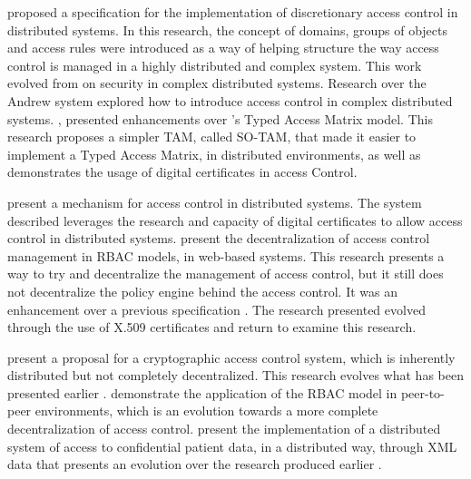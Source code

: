 \citeauthor{moffett_specifying_1990} \cite{moffett_specifying_1990} proposed a specification for the implementation of discretionary access control in distributed systems. In this research, the concept of domains, groups of objects and access rules were introduced as a way of helping structure the way access control is managed in a highly distributed and complex system. This work evolved from \citeauthor{satyanarayanan_integrating_1989} \cite{satyanarayanan_integrating_1989} on security in complex distributed systems. Research over the Andrew system \cite{satyanarayanan_integrating_1989} explored how to introduce access control in complex distributed systems. \citeauthor{sandhu_implementation_1992} \cite{sandhu_implementation_1992}, presented enhancements over  \citeauthor{sandhu_typed_1992}’s \cite{sandhu_typed_1992} Typed Access Matrix model. This research proposes a simpler TAM, called SO-TAM, that made it easier to implement a Typed Access Matrix, in distributed environments, as well as demonstrates the usage of digital certificates in access Control.

\citeauthor{johnston_authorization_1998} \cite{johnston_authorization_1998} present a mechanism for access control in distributed systems. The system described leverages the research and capacity of digital certificates to allow access control in distributed systems. \citeauthor{sandhu_decentralized_1998} \cite{sandhu_decentralized_1998} present the decentralization of access control management in RBAC models, in web-based systems. This research presents a way to try and decentralize the management of access control, but it still does not decentralize the policy engine behind the access control. It was an enhancement over a previous specification \cite{barkley_role_1997}. The research presented \cite{sandhu_decentralized_1998} evolved through the use of X.509 certificates \cite{park_smart_1999} and \citeauthor{park_role-based_2001} \cite{park_role-based_2001} return to examine this research.

\citeauthor{harrington_cryptographic_2003} \cite{harrington_cryptographic_2003} present a proposal for a cryptographic access control system, which is inherently distributed but not completely decentralized. This research evolves what has been presented earlier \cite{satyanarayanan_integrating_1989}. \citeauthor{park_role-based_2003} \cite{park_role-based_2003} demonstrate the application of the RBAC model in peer-to-peer environments, which is an evolution towards a more complete decentralization of access control. \citeauthor{abiteboul_electronic_2004} \cite{abiteboul_electronic_2004} present the implementation of a distributed system of access to confidential patient data, in a distributed way, through XML data that presents an evolution over the research produced earlier \cite{damiani_fine-grained_2002}.


